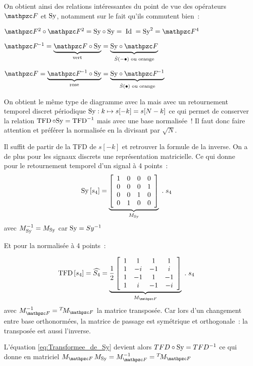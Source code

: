 On obtient ainsi des relations intéressantes du point de vue des
opérateurs $\F$ et $\mathrm{Sy}$, notamment sur le fait qu'ils commutent
bien~:
\begin{description}
\item $\F^2\circ\F^2 = \Sy\circ\Sy =\; \Id \; = \Sy^2 = \F^4$
\item $\Finv = \caCest{\F\circ\Sy}{\text{vert}} = \caCest{\Sy\circ\F}{\hat{S}\p{-\bullet}\text{ ou orange}}$
\item $\F = \caCest{\Finv\circ\Sy}{\text{rose}} = \caCest{\Sy\circ\Finv}{\hat{S}\p{\bullet}\text{ ou orange}}$
\end{description}
\begin{remarque} 
  
  On obtient le même type de diagramme avec la \TFD{} mais avec un
  retournement temporel discret périodique
  $\mathrm{Sy} : k \mapsto s[-k]= s[N-k]$ ce qui permet de conserver la
  relation $\mathop{\mathrm{TFD}}\circ\mathrm{Sy}=\mathop{\mathrm{TFD}}^{-1}$ mais avec une base normalisée~!
  Il faut donc faire attention et préférer la \TFD{} normalisée en la
  divisant par $\sqrt{N}$.
  
  Il suffit de partir de la TFD de $s[-k]$ et retrouver la formule de
  la \TFD{} inverse. On a de plus pour les signaux discrets une
  représentation matricielle. Ce qui donne pour le retournement
  temporel d'un signal à 4 points~:
  \begin{equation}
    \label{eq:sy_matriciel}
    \mathrm{Sy}\left[s_4\right] = \underbrace{
      \left[
        \begin{array}{cccc}
          1 & 0 & 0 & 0\\
          0 & 0 & 0 & 1\\
          0 & 0 & 1 & 0\\
          0 & 1 & 0 & 0
        \end{array}\right]}_{M_{\mathrm{Sy}}}\;.\;s_4
  \end{equation}
  avec $M_{\mathrm{Sy}}^{-1}=M_{\mathrm{Sy}}$ car $\mathrm{Sy}=Sy^{-1}$
      
  Et pour la \TFD{} normalisée à 4 points~:
  
  \begin{equation}
    \label{eq:tfd4_matriciel}
    \mTFD\b{s_4} = \widehat{S_4} = \caCest{
      \frac{1}{2}\left[
        \begin{array}{cccc}
          1 & 1 & 1 & 1\\
          1 & -i & -1 & i\\
          1 & -1 & 1 & -1\\
          1 & i & -1 & -i
        \end{array}
      \right]}{M_{\F}}\;.\;s_4
  \end{equation}
  avec $M_{\F}^{-1}=\Tr{M_{\F}}$ la matrice transposée. Car lors d'un
  changement entre base orthonormées, la matrice de passage est
  symétrique et orthogonale~: la transposée est aussi l'inverse.
  
  
  L'équation \eqref{eq:Transformee_de_Sy} devient alors
  $TFD\circ\mathrm{Sy} = TFD{}^{-1}$ ce qui donne en matriciel
  $M_{\F}\,M_{\Sy} = M_{\F}^{-1} = \Tr{M_{\F}} $
\end{remarque}


